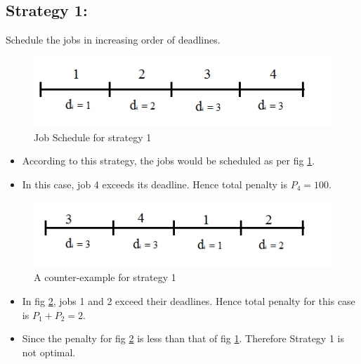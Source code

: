 \documentclass[pdftex,a4paper,12pt]{report}
\begin{document}
\subsection{Strategy 1:}Schedule the jobs in increasing order of deadlines.
\begin{figure}[h]
\centering
\includegraphics[scale=0.5]{fig1.png}
\caption{Job Schedule for strategy 1}
\label{fig1}
\end{figure}
\begin{itemize}
\item According to this strategy, the jobs would be scheduled as per fig \ref{fig1}.
\item In this case, job 4 exceeds its deadline. Hence total penalty is $P_{4}=100$.
\end{itemize}
\begin{figure}[h]
\centering
\includegraphics[scale=0.5]{fig2.png}
\caption{A counter-example for strategy 1}
\label{fig2}
\end{figure}
\begin{itemize}
\item In fig \ref{fig2}, jobs 1 and 2 exceed their deadlines. Hence total penalty for this case is $P_{1}+P_{2} = 2$.
\item Since the penalty for fig \ref{fig2} is less than that of fig \ref{fig1}. Therefore Strategy 1 is not optimal.
\end{itemize}
\end{document}
